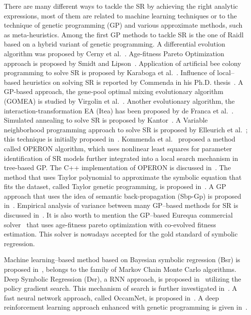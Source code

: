 \documentclass[a4paper,12pt]{elsarticle}
\begin{document}
	 There are many different ways to tackle the SR by achieving the right analytic expressions, most of them are related to machine learning techniques or to the technique of genetic programming (GP) and various approximate methods, such as meta-heuristics. Among the first GP methods to tackle SR is the one of Raidl~\cite{raidl1998hybrid} based on a hybrid variant of genetic programming. A differential evolution algorithm was proposed by Cerny et al.~\cite{cerny2008using}. Age-fitness Pareto Optimization approach is proposed by Smidt and Lipson~\cite{schmidt2010age}.  Application of artificial bee colony programming to solve SR is proposed by Karaboga et al.~\cite{karaboga2012artificial}. 
	 Influence of local--based heuristics on solving SR is reported by Commenda in his Ph.D. thesis~\cite{kommenda2018local}. A  GP-based approach, the gene-pool optimal mixing evolutionary algorithm (GOMEA) is studied by Virgolin et al.~\cite{virgolin2021improving}.  Another evolutionary algorithm, the interaction-transformation EA (Itea) has been proposed by de Franca et al.~\cite{de2021interaction}. Simulated annealing to solve SR is proposed by Kantor~\cite{kantor2021simulated}. A Variable neighborhood programming approach to solve SR  is proposed by Elleurich et al.~\cite{elleuch2020variable}; this technique is initially proposed in~\cite{elleuch2016variable}. 
	 Kommenda et al.~\cite{kommenda2020parameter} proposed a method called OPERON algorithm, which uses nonlinear least squares for parameter identification of SR models further integrated into a local search mechanism in
	 tree-based GP. The C++ implementation of OPERON is discussed in~\cite{burlacu2020operon}. The method that uses Taylor polynomial to approximate the symbolic equation that fits the dataset, called Taylor genetic programming, is proposed in~\cite{he2022taylor}. A GP approach that uses the idea of semantic back-propagation (Sbp-Gp) is proposed in~\cite{virgolin2019linear}.   Empirical analysis of variance between many GP--based methods for SR is discussed in~\cite{kammerer2021empirical}. It is also worth to mention the GP--based Eurequa commercial solver~\cite{schmidt2009distilling, schmidt2011machine} that uses age-fitness pareto optimization  with co-evolved fitness estimation. This solver is nowadays accepted for the gold standard of symbolic regression.   
	 
	 
	 Machine learning--based method   based on Bayesian symbolic regression (Bsr) is proposed in~\cite{jin2019bayesian},  belongs to the family of Markov Chain Monte Carlo algorithms. Deep Symbolic Regression (Dsr), a RNN approach, is proposed in~\cite{petersen2019deep} utilizing the policy gradient search. This mechanism of search is further investigated in~\cite{landajuela2021improving}. A fast neural network approach, called OccamNet,  is proposed in~\cite{costa2020fast}.  A deep reinforcement learning approach enhanced with genetic programming is given in~\cite{mundhenk2021symbolic}. 
	
\end{document}
